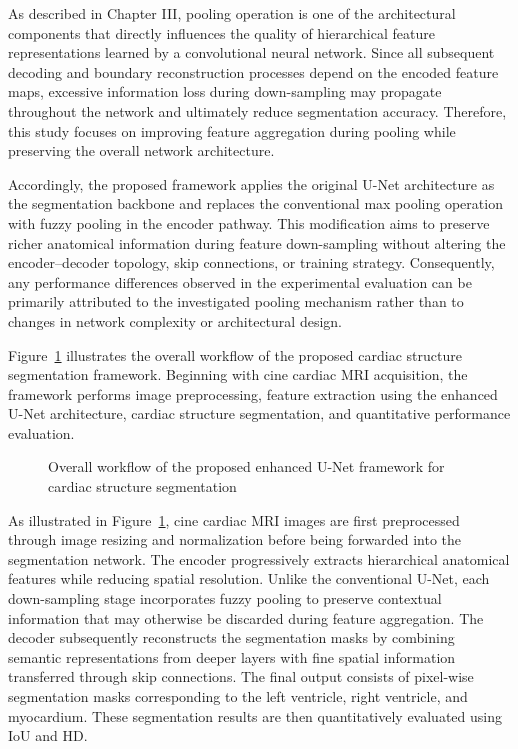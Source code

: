 As described in Chapter III, pooling operation is one of the architectural components that directly influences the quality of hierarchical feature representations learned by a convolutional neural network. Since all subsequent decoding and boundary reconstruction processes depend on the encoded feature maps, excessive information loss during down-sampling may propagate throughout the network and ultimately reduce segmentation accuracy. Therefore, this study focuses on improving feature aggregation during pooling while preserving the overall network architecture.

Accordingly, the proposed framework applies the original U-Net architecture as the segmentation backbone and replaces the conventional max pooling operation with fuzzy pooling in the encoder pathway. This modification aims to preserve richer anatomical information during feature down-sampling without altering the encoder--decoder topology, skip connections, or training strategy. Consequently, any performance differences observed in the experimental evaluation can be primarily attributed to the investigated pooling mechanism rather than to changes in network complexity or architectural design.

Figure~\ref{fig:ch4-workflow} illustrates the overall workflow of the proposed cardiac structure segmentation framework. Beginning with cine cardiac MRI acquisition, the framework performs image preprocessing, feature extraction using the enhanced U-Net architecture, cardiac structure segmentation, and quantitative performance evaluation.

\begin{figure}[htbp]
	\centering
	\caption{Overall workflow of the proposed enhanced U-Net framework for cardiac structure segmentation}
	\label{fig:ch4-workflow}
\end{figure}

As illustrated in Figure~\ref{fig:ch4-workflow}, cine cardiac MRI images are first preprocessed through image resizing and normalization before being forwarded into the segmentation network. The encoder progressively extracts hierarchical anatomical features while reducing spatial resolution. Unlike the conventional U-Net, each down-sampling stage incorporates fuzzy pooling to preserve contextual information that may otherwise be discarded during feature aggregation. The decoder subsequently reconstructs the segmentation masks by combining semantic representations from deeper layers with fine spatial information transferred through skip connections. The final output consists of pixel-wise segmentation masks corresponding to the left ventricle, right ventricle, and myocardium. These segmentation results are then quantitatively evaluated using IoU and HD.

